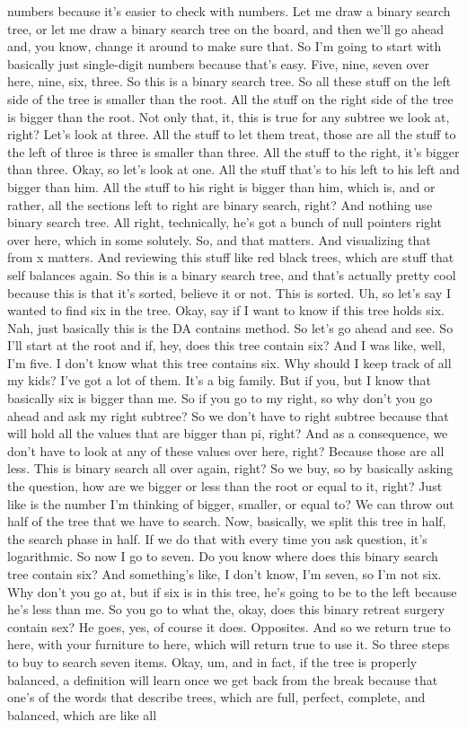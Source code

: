 numbers because it's easier to check with numbers. Let me draw a binary search tree, or let me draw a binary search tree on the board, and then we'll go ahead and, you know, change it around to make sure that. So I'm going to start with basically just single-digit numbers because that's easy. Five, nine, seven over here, nine, six, three. So this is a binary search tree. So all these stuff on the left side of the tree is smaller than the root. All the stuff on the right side of the tree is bigger than the root. Not only that, it, this is true for any subtree we look at, right? Let's look at three. All the stuff to let them treat, those are all the stuff to the left of three is three is smaller than three. All the stuff to the right, it's bigger than three. Okay, so let's look at one. All the stuff that's to his left to his left and bigger than him. All the stuff to his right is bigger than him, which is, and or rather, all the sections left to right are binary search, right? And nothing use binary search tree. All right, technically, he's got a bunch of null pointers right over here, which in some solutely. So, and that matters. And visualizing that from x matters. And reviewing this stuff like red black trees, which are stuff that self balances again. So this is a binary search tree, and that's actually pretty cool because this is that it's sorted, believe it or not. This is sorted. Uh, so let's say I wanted to find six in the tree. Okay, say if I want to know if this tree holds six. Nah, just basically this is the DA contains method. So let's go ahead and see. So I'll start at the root and if, hey, does this tree contain six? And I was like, well, I'm five. I don't know what this tree contains six. Why should I keep track of all my kids? I've got a lot of them. It's a big family. But if you, but I know that basically six is bigger than me. So if you go to my right, so why don't you go ahead and ask my right subtree? So we don't have to right subtree because that will hold all the values that are bigger than pi, right? And as a consequence, we don't have to look at any of these values over here, right? Because those are all less. This is binary search all over again, right? So we buy, so by basically asking the question, how are we bigger or less than the root or equal to it, right? Just like is the number I'm thinking of bigger, smaller, or equal to? We can throw out half of the tree that we have to search. Now, basically, we split this tree in half, the search phase in half. If we do that with every time you ask question, it's logarithmic. So now I go to seven. Do you know where does this binary search tree contain six? And something's like, I don't know, I'm seven, so I'm not six. Why don't you go at, but if six is in this tree, he's going to be to the left because he's less than me. So you go to what the, okay, does this binary retreat surgery contain sex? He goes, yes, of course it does. Opposites. And so we return true to here, with your furniture to here, which will return true to use it. So three steps to buy to search seven items. Okay, um, and in fact, if the tree is properly balanced, a definition will learn once we get back from the break because that one's of the words that describe trees, which are full, perfect, complete, and balanced, which are like all 